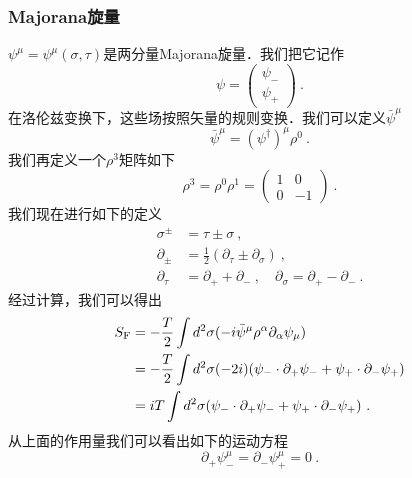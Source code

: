 \subsubsection{Majorana旋量}
$\psi^\mu = \psi^\mu(\sigma,\tau)$是两分量Majorana旋量．我们把它记作
\begin{equation}
\psi = \begin{pmatrix}
\psi_- \\
\psi_+
\end{pmatrix}~.
\end{equation}
在洛伦兹变换下，这些场按照矢量的规则变换．我们可以定义$\bar\psi^\mu$
\begin{equation}
\bar\psi^\mu = (\psi^\dagger)^\mu \rho^0~.
\end{equation}
我们再定义一个$\rho^3$矩阵如下
\begin{equation}
\rho^3 = \rho^0 \rho^1 = \begin{pmatrix}
1 & 0 \\
0 & -1 
\end{pmatrix}~.
\end{equation}
我们现在进行如下的定义
\begin{equation}
\begin{aligned}
\sigma^{\pm} & = \tau \pm \sigma~, \\
\partial_{\pm} & = \frac{1}{2} (\partial_\tau \pm \partial_\sigma)~, \\
\partial_\tau & = \partial_+ + \partial_-~, \quad \partial_\sigma = \partial_+ - \partial_- ~.
\end{aligned}
\end{equation}
经过计算，我们可以得出
\begin{equation}
\begin{aligned}
S_{\rm F} & = - \frac{T}{2} \int d^2 \sigma (- i \bar \psi^\mu \rho^\alpha \partial_\alpha \psi_\mu ) \\
& = - \frac{T}{2} \int d^2\sigma (-2i) (\psi_-\cdot\partial_+\psi_- + \psi_+\cdot \partial_- \psi_+) \\
& = i T\int d^2\sigma (\psi_-\cdot \partial_+ \psi_- +\psi_+\cdot \partial_- \psi_+ )~.
\end{aligned}
\end{equation}
从上面的作用量我们可以看出如下的运动方程
\begin{equation}
\partial_+\psi^\mu_- = \partial_-\psi^\mu_+ = 0~.
\end{equation}

